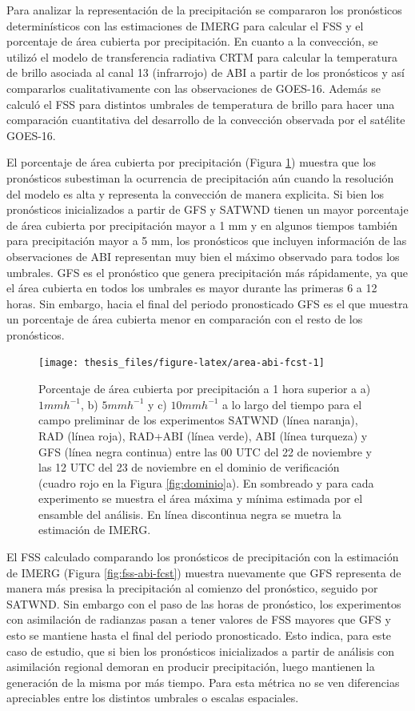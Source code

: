 \documentclass[12pt,oneside,a4paper]{reedthesis}
\begin{document}
Para analizar la representación de la precipitación se compararon los pronósticos determinísticos con las estimaciones de IMERG para calcular el FSS y el porcentaje de área cubierta por precipitación. En cuanto a la convección, se utilizó el modelo de transferencia radiativa CRTM para calcular la temperatura de brillo asociada al canal 13 (infrarrojo) de ABI a partir de los pronósticos y así compararlos cualitativamente con las observaciones de GOES-16. Además se calculó el FSS para distintos umbrales de temperatura de brillo para hacer una comparación cuantitativa del desarrollo de la convección observada por el satélite GOES-16.

El porcentaje de área cubierta por precipitación (Figura \ref{fig:area-abi-fcst}) muestra que los pronósticos subestiman la ocurrencia de precipitación aún cuando la resolución del modelo es alta y representa la convección de manera explicita. Si bien los pronósticos inicializados a partir de GFS y SATWND tienen un mayor porcentaje de área cubierta por precipitación mayor a 1 mm y en algunos tiempos también para precipitación mayor a 5 mm, los pronósticos que incluyen información de las observaciones de ABI representan muy bien el máximo observado para todos los umbrales. GFS es el pronóstico que genera precipitación más rápidamente, ya que el área cubierta en todos los umbrales es mayor durante las primeras 6 a 12 horas. Sin embargo, hacia el final del periodo pronosticado GFS es el que muestra un porcentaje de área cubierta menor en comparación con el resto de los pronósticos.


\begin{figure}
\texttt{[image: thesis\_files/figure-latex/area-abi-fcst-1]} \caption{Porcentaje de área cubierta por precipitación a 1 hora superior a a) \(1 mmh^{-1}\), b) \(5 mmh^{-1}\) y c) \(10 mmh^{-1}\) a lo largo del tiempo para el campo preliminar de los experimentos SATWND (línea naranja), RAD (línea roja), RAD+ABI (línea verde), ABI (línea turqueza) y GFS (línea negra continua) entre las 00 UTC del 22 de noviembre y las 12 UTC del 23 de noviembre en el dominio de verificación (cuadro rojo en la Figura \ref{fig:dominio}a). En sombreado y para cada experimento se muestra el área máxima y mínima estimada por el ensamble del análisis. En línea discontinua negra se muetra la estimación de IMERG.}\label{fig:area-abi-fcst}
\end{figure}
El FSS calculado comparando los pronósticos de precipitación con la estimación de IMERG (Figura \ref{fig:fss-abi-fcst}) muestra nuevamente que GFS representa de manera más presisa la precipitación al comienzo del pronóstico, seguido por SATWND. Sin embargo con el paso de las horas de pronóstico, los experimentos con asimilación de radianzas pasan a tener valores de FSS mayores que GFS y esto se mantiene hasta el final del periodo pronosticado. Esto indica, para este caso de estudio, que si bien los pronósticos inicializados a partir de análisis con asimilación regional demoran en producir precipitación, luego mantienen la generación de la misma por más tiempo. Para esta métrica no se ven diferencias apreciables entre los distintos umbrales o escalas espaciales.
\end{document}
